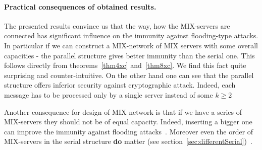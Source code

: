 \documentclass[submission]{dmtcs}
\newcommand{\Marek} [1]{\marginpar{\scriptsize {\bf MKlo}:#1}}
\begin{document}
\paragraph{Practical consequences of obtained results.} The presented results convince us that the way, how the MIX-servers are connected has significant influence on the immunity against flooding-type attacks. In particular if we can construct a MIX-network of MIX servers with some overall capacities
- the parallel structure gives better immunity than the serial one.  This follows directly from  theorems~\ref{thm4xc} and~\ref{thm8xc}.  
We find this fact quite  surprising and counter-intuitive. On the other hand one can see that the parallel structure offers inferior security against cryptographic attack. Indeed, each message has to be processed only by a single server instead of some $k\geq 2$ 

Another consequence for design of MIX network is that if we have a series of MIX-servers they should not be of equal capacity. Indeed,  inserting a bigger one can improve the immunity against flooding attacks~. 
Moreover even the order of MIX-servers in the serial structure \textbf{do}  matter  (see section~\ref{sec:differentSerial})~.    



 

%




\end{document}

